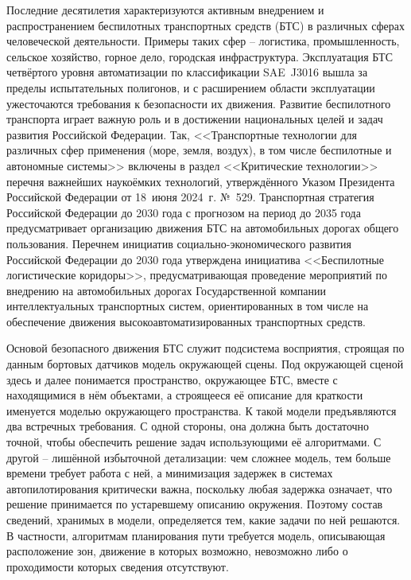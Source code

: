 {\actuality} Последние десятилетия характеризуются активным внедрением и распространением беспилотных транспортных средств (БТС) в различных сферах человеческой деятельности. Примеры таких сфер -- логистика, промышленность, сельское хозяйство, горное дело, городская инфраструктура. Эксплуатация БТС четвёртого уровня автоматизации по классификации SAE~J3016 вышла за пределы испытательных полигонов, и с расширением области эксплуатации ужесточаются требования к безопасности их движения. Развитие беспилотного транспорта играет важную роль и в достижении национальных целей и задач развития Российской Федерации. Так, <<Транспортные технологии для различных сфер применения (море, земля, воздух), в том числе беспилотные и автономные системы>> включены в раздел <<Критические технологии>> перечня важнейших наукоёмких технологий, утверждённого Указом Президента Российской Федерации от 18~июня 2024~г. №~529. Транспортная стратегия Российской Федерации до 2030 года с прогнозом на период до 2035 года предусматривает организацию движения БТС на автомобильных дорогах общего пользования. Перечнем инициатив социально-экономического развития Российской Федерации до 2030 года утверждена инициатива <<Беспилотные логистические коридоры>>, предусматривающая проведение мероприятий по внедрению на автомобильных дорогах Государственной компании интеллектуальных транспортных систем, ориентированных в том числе на обеспечение движения высокоавтоматизированных транспортных средств.

Основой безопасного движения БТС служит подсистема восприятия, строящая по данным бортовых датчиков модель окружающей сцены. Под окружающей сценой здесь и далее понимается пространство, окружающее БТС, вместе с находящимися в нём объектами, а строящееся её описание для краткости именуется моделью окружающего пространства. К такой модели предъявляются два встречных требования. С одной стороны, она должна быть достаточно точной, чтобы обеспечить решение задач использующими её алгоритмами. С другой -- лишённой избыточной детализации: чем сложнее модель, тем больше времени требует работа с ней, а минимизация задержек в системах автопилотирования критически важна, поскольку любая задержка означает, что решение принимается по устаревшему описанию окружения. Поэтому состав сведений, хранимых в модели, определяется тем, какие задачи по ней решаются. В частности, алгоритмам планирования пути требуется модель, описывающая расположение зон, движение в которых возможно, невозможно либо о проходимости которых сведения отсутствуют.

